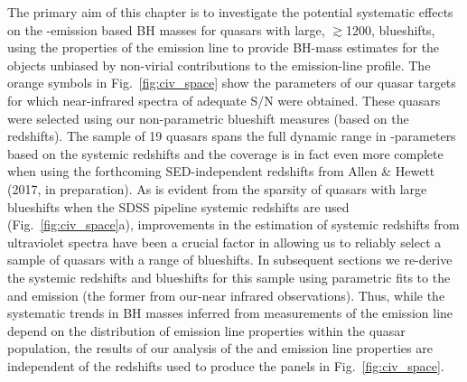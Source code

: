 The primary aim of this chapter is to investigate the potential systematic effects on the -emission based BH masses for quasars with large, $\gtrsim$1200\kms,  blueshifts, using the properties of the \ha emission line to provide BH-mass estimates for the objects unbiased by non-virial contributions to the emission-line profile.
The orange symbols in Fig.~\ref{fig:civ_space} show the  parameters of our quasar targets for which near-infrared spectra of adequate S/N were obtained. 
These quasars were selected using our non-parametric blueshift measures (based on the \citet{hewett10} redshifts). 
The sample of 19 quasars spans the full dynamic range in -parameters based on the \citet{hewett10} systemic redshifts and the coverage is in fact even more complete when using the forthcoming SED-independent redshifts from Allen \& Hewett (2017, in preparation).
As is evident from the sparsity of quasars with large  blueshifts when the SDSS pipeline systemic redshifts are used (Fig.~\ref{fig:civ_space}a), improvements in the estimation of systemic redshifts from ultraviolet spectra have been a crucial factor in allowing us to reliably select a sample of quasars with a range of  blueshifts. 
In subsequent sections we re-derive the systemic redshifts and  blueshifts for this sample using parametric fits to the \ha and  emission (the former from our-near infrared observations). 
Thus, while the systematic trends in BH masses inferred from measurements of the  emission line depend on the distribution of  emission line properties within the quasar population, the results of our analysis of the \ha and  emission line properties are independent of the redshifts used to produce the panels in Fig.~\ref{fig:civ_space}.  